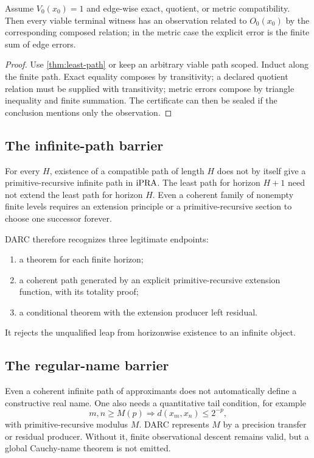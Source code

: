 \begin{theorem}
\label{thm:observational-descent}
Assume \(V_0(x_0)=1\) and edge-wise exact, quotient, or metric compatibility.
Then every viable terminal witness has an observation related to
\(O_0(x_0)\) by the corresponding composed relation; in the metric case the
explicit error is the finite sum of edge errors.
\end{theorem}

\begin{proof}
Use \cref{thm:least-path} or keep an arbitrary viable path scoped.  Induct along
the finite path.  Exact equality composes by transitivity; a declared
quotient relation must be supplied with transitivity; metric errors compose by
triangle inequality and finite summation.  The certificate can then be sealed
if the conclusion mentions only the observation.
\end{proof}

\subsection{The infinite-path barrier}

For every \(H\), existence of a compatible path of length \(H\) does not by
itself give a primitive-recursive infinite path in \(\mathrm{iPRA}\).  The least path
for horizon \(H+1\) need not extend the least path for horizon \(H\).  Even a
coherent family of nonempty finite levels requires an extension principle or a
primitive-recursive section to choose one successor forever.

DARC therefore recognizes three legitimate endpoints:
\begin{enumerate}
  \item a theorem for each finite horizon;
  \item a coherent path generated by an explicit primitive-recursive extension
        function, with its totality proof;
  \item a conditional theorem with the extension producer left residual.
\end{enumerate}
It rejects the unqualified leap from horizonwise existence to an infinite
object.

\subsection{The regular-name barrier}

Even a coherent infinite path of approximants does not automatically define a
constructive real name.  One also needs a quantitative tail condition, for
example
\[
  m,n\ge M(p)\Longrightarrow d(x_m,x_n)\le 2^{-p},
\]
with primitive-recursive modulus \(M\).  DARC represents \(M\) by a precision
transfer or residual producer.  Without it, finite observational descent
remains valid, but a global Cauchy-name theorem is not emitted.

